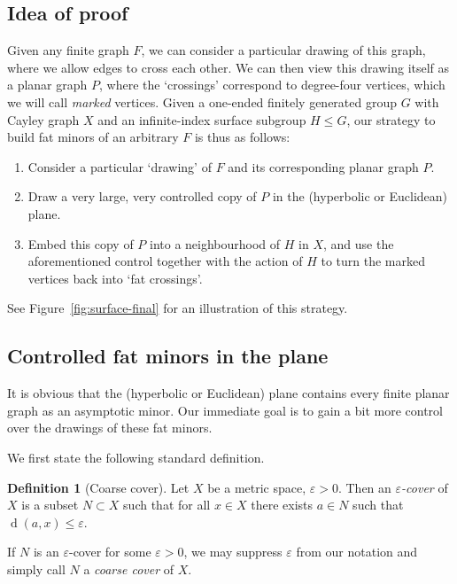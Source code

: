 \documentclass[10pt,a4paper]{amsart}
\DeclareMathOperator{\dist}{d}
\theoremstyle{definition}
\newtheorem{definition}[theorem]{Definition}
\begin{document}
\subsection{Idea of proof}

Given any finite graph $F$, we can consider a particular drawing of this graph, where we allow edges to cross each other. We can then view this drawing itself as a planar graph $P$, where the `crossings' correspond to degree-four vertices, which we will call \textit{marked} vertices.
Given a one-ended finitely generated group $G$ with Cayley graph $X$ and an infinite-index surface subgroup $H \leq G$, our strategy to build fat minors of an arbitrary $F$ is thus as follows:
\begin{enumerate}
	\item Consider a particular `drawing' of $F$ and its corresponding planar graph $P$. 
	\item Draw a very large, very controlled copy of $P$ in the (hyperbolic or Euclidean) plane. 
	\item Embed this copy of $P$ into a neighbourhood of $H$ in $X$, and use the aforementioned control together with the action of $H$ to turn the marked vertices back into `fat crossings'. 
\end{enumerate}
See Figure~\ref{fig:surface-final} for an illustration of this strategy. 


\subsection{Controlled fat minors in the plane}



It is obvious that the (hyperbolic or Euclidean) plane contains every finite planar graph as an asymptotic minor. Our immediate goal is to gain a bit more control over the drawings of these fat minors. 

We first state the following standard definition. 

\begin{definition}[Coarse cover]
    Let $X$ be a metric space, $\varepsilon > 0$. Then an \textit{$\varepsilon$-cover} of $X$ is a subset $N \subset X$ such that for all $x \in X$ there exists $a \in N$ such that $\dist(a,x) \leq \varepsilon$. 

    If $N$ is an $\varepsilon$-cover for some $\varepsilon > 0$, we may suppress $\varepsilon$ from our notation and simply call $N$ a \textit{coarse cover} of $X$. 
\end{definition}
\end{document}
